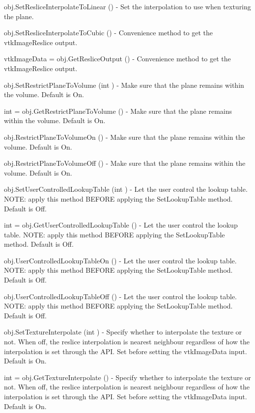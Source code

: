 \begin{DoxyItemize}
\item {\ttfamily obj.\-Set\-Reslice\-Interpolate\-To\-Linear ()} -\/ Set the interpolation to use when texturing the plane.  
\item {\ttfamily obj.\-Set\-Reslice\-Interpolate\-To\-Cubic ()} -\/ Convenience method to get the vtk\-Image\-Reslice output.  
\item {\ttfamily vtk\-Image\-Data = obj.\-Get\-Reslice\-Output ()} -\/ Convenience method to get the vtk\-Image\-Reslice output.  
\item {\ttfamily obj.\-Set\-Restrict\-Plane\-To\-Volume (int )} -\/ Make sure that the plane remains within the volume. Default is On.  
\item {\ttfamily int = obj.\-Get\-Restrict\-Plane\-To\-Volume ()} -\/ Make sure that the plane remains within the volume. Default is On.  
\item {\ttfamily obj.\-Restrict\-Plane\-To\-Volume\-On ()} -\/ Make sure that the plane remains within the volume. Default is On.  
\item {\ttfamily obj.\-Restrict\-Plane\-To\-Volume\-Off ()} -\/ Make sure that the plane remains within the volume. Default is On.  
\item {\ttfamily obj.\-Set\-User\-Controlled\-Lookup\-Table (int )} -\/ Let the user control the lookup table. N\-O\-T\-E\-: apply this method B\-E\-F\-O\-R\-E applying the Set\-Lookup\-Table method. Default is Off.  
\item {\ttfamily int = obj.\-Get\-User\-Controlled\-Lookup\-Table ()} -\/ Let the user control the lookup table. N\-O\-T\-E\-: apply this method B\-E\-F\-O\-R\-E applying the Set\-Lookup\-Table method. Default is Off.  
\item {\ttfamily obj.\-User\-Controlled\-Lookup\-Table\-On ()} -\/ Let the user control the lookup table. N\-O\-T\-E\-: apply this method B\-E\-F\-O\-R\-E applying the Set\-Lookup\-Table method. Default is Off.  
\item {\ttfamily obj.\-User\-Controlled\-Lookup\-Table\-Off ()} -\/ Let the user control the lookup table. N\-O\-T\-E\-: apply this method B\-E\-F\-O\-R\-E applying the Set\-Lookup\-Table method. Default is Off.  
\item {\ttfamily obj.\-Set\-Texture\-Interpolate (int )} -\/ Specify whether to interpolate the texture or not. When off, the reslice interpolation is nearest neighbour regardless of how the interpolation is set through the A\-P\-I. Set before setting the vtk\-Image\-Data input. Default is On.  
\item {\ttfamily int = obj.\-Get\-Texture\-Interpolate ()} -\/ Specify whether to interpolate the texture or not. When off, the reslice interpolation is nearest neighbour regardless of how the interpolation is set through the A\-P\-I. Set before setting the vtk\-Image\-Data input. Default is On.  

\end{DoxyItemize}

